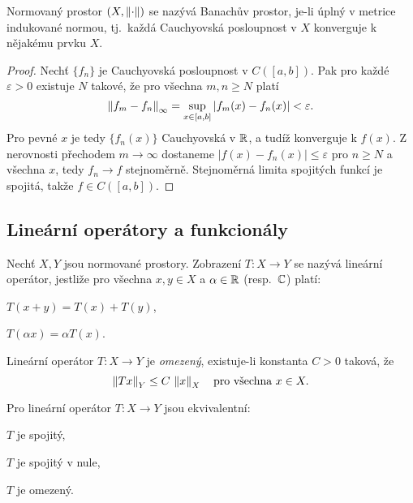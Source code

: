 \begin{definition}
\label{def:banach-prostor}
Normovaný prostor $(X,\left\lVert \cdot \right\rVert)$ se nazývá Banachův prostor, je-li úplný v metrice indukované normou, tj.\ každá Cauchyovská posloupnost v $X$ konverguje k nějakému prvku $X$.
\end{definition}


\begin{proof}
Nechť $\{f_n\}$ je Cauchyovská posloupnost v $C([a,b])$. Pak pro každé $\varepsilon>0$ existuje $N$ takové, že pro všechna $m,n\ge N$ platí
\[
\left\lVert f_m-f_n \right\rVert_\infty=\sup_{x\in[a,b]}|f_m(x)-f_n(x)|<\varepsilon.
\]
Pro pevné $x$ je tedy $\{f_n(x)\}$ Cauchyovská v $\mathbb{R}$, a tudíž konverguje k $f(x)$. Z nerovnosti přechodem $m\to\infty$ dostaneme $|f(x)-f_n(x)|\le\varepsilon$ pro $n\ge N$ a všechna $x$, tedy $f_n\to f$ stejnoměrně. Stejnoměrná limita spojitých funkcí je spojitá, takže $f\in C([a,b])$.
\end{proof}

\spc

\subsection{Lineární operátory a funkcionály}
\label{subsec:linearni-operatory}

\begin{definition}
\label{def:linearni-operator}
Nechť $X,Y$ jsou normované prostory. Zobrazení $T:X\to Y$ se nazývá lineární operátor, jestliže pro všechna $x,y\in X$ a $\alpha\in\mathbb{R}$ (resp.\ $\mathbb{C}$) platí:
\begin{romanenum}
\item $T(x+y)=T(x)+T(y)$,
\item $T(\alpha x)=\alpha T(x)$.
\end{romanenum}
\end{definition}

\begin{definition}
\label{def:omezeny-operator}
Lineární operátor $T:X\to Y$ je \emph{omezený}, existuje-li konstanta $C>0$ taková, že
\[
\left\lVert Tx \right\rVert_Y\le C\,\left\lVert x \right\rVert_X \quad \text{pro všechna } x\in X.
\]
\end{definition}

\begin{theorem}
\label{vet:omezenost-spojitost}
Pro lineární operátor $T:X\to Y$ jsou ekvivalentní:
\begin{romanenum}
\item $T$ je spojitý,
\item $T$ je spojitý v nule,
\item $T$ je omezený.
\end{romanenum}
\end{theorem}

